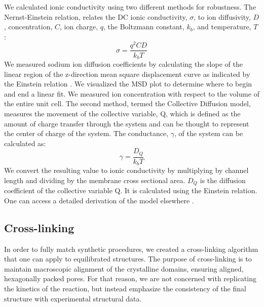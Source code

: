 \documentclass[journal=jpcbfk,manusciprt=article]{achemso}
\begin{document}
  We calculated ionic conductivity using two different methods for robustness.
  The Nernst-Einstein relation, relates the DC ionic conductivity, $\sigma$, to ion
  diffusivity, $D$, concentration, $C$, ion charge, $q$, the Boltzmann constant,
  $k_b$, and temperature, $T$: 
  \begin{equation}
	\sigma = \dfrac{q^2CD}{k_b T} 
	\label{eqn:nernst_einstein}
  \end{equation}
  We measured sodium ion diffusion coefficients by calculating the slope
  of the linear region of the z-direction mean square displacement curve as
  indicated by the Einstein relation \cite{einstein_investigations_1956}. We
  visualized the MSD plot to determine where to begin and end a linear fit. We
  measured ion concentration with respect to the volume of the entire unit cell. 
  The second method, termed the Collective Diffusion model, measures the
  movement of the collective variable, Q, which is defined as the amount of
  charge transfer through the system and can be thought to represent the center
  of charge of the system. The conductance, $\gamma$, of the system can be
  calculated as:
  \begin{equation}
	 \gamma = \dfrac{D_Q}{k_b T} 
	\label{eqn:collective_diffusion}
  \end{equation}
  We convert the resulting value to ionic conductivity by multiplying by
  channel length and dividing by the membrane cross sectional area. $D_Q$ is the
  diffusion coefficient of the collective variable Q. It is calculated using the
  Einstein relation. One can access a detailed derivation of the model elsewhere
  \cite{liu_collective_2013}.
  
  \subsection{Cross-linking}
  
  In order to fully match synthetic procedures, we created a cross-linking
  algorithm that one can apply to equilibrated structures. The purpose of
  cross-linking is to maintain macroscopic alignment of the crystalline domains,
  ensuring aligned, hexagonally packed pores. For that reason, we are not
  concerned with replicating the kinetics of the reaction, but instead emphasize
  the consistency of the final structure with experimental structural data. 
\end{document}
